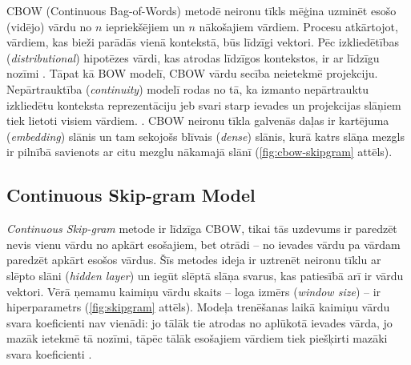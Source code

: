 CBOW (Continuous Bag-of-Words) metodē neironu tīkls mēģina uzminēt esošo (vidējo) vārdu no $n$ iepriekšējiem un $n$ nākošajiem vārdiem. Procesu atkārtojot, vārdiem, kas bieži parādās vienā kontekstā, būs līdzīgi vektori. Pēc izkliedētības (\textit{distributional}) hipotēzes vārdi, kas atrodas līdzīgos kontekstos, ir ar līdzīgu nozīmi \cite{word2vec2013}. Tāpat kā BOW modelī, CBOW vārdu secība neietekmē projekciju. Nepārtrauktība (\textit{continuity}) modelī rodas no tā, ka izmanto nepārtrauktu izkliedētu konteksta reprezentāciju
jeb svari starp ievades un projekcijas slāņiem tiek lietoti visiem vārdiem.
\cite{word2vec2013}.
CBOW neironu tīkla galvenās daļas ir kartējuma (\textit{embedding}) slānis un tam sekojošs blīvais (\textit{dense}) slānis, kurā katrs slāņa mezgls ir pilnībā savienots ar citu mezglu nākamajā slānī (\ref{fig:cbow-skipgram} attēls).



\subsection{Continuous Skip-gram Model}


\textit{Continuous Skip-gram} metode ir līdzīga CBOW, tikai tās uzdevums ir paredzēt nevis vienu vārdu no apkārt esošajiem, bet otrādi -- no ievades vārdu pa vārdam paredzēt apkārt esošos vārdus.
Šīs metodes ideja ir uztrenēt neironu tīklu ar slēpto slāni (\textit{hidden layer}) un iegūt slēptā slāņa svarus, kas patiesībā arī ir vārdu vektori. Vērā ņemamu kaimiņu vārdu skaits -- loga izmērs (\textit{window size}) -- ir hiperparametrs (\ref{fig:skipgram} attēls). Modeļa trenēšanas laikā kaimiņu vārdu svara koeficienti nav vienādi: jo tālāk tie atrodas no aplūkotā ievades vārda, jo mazāk ietekmē tā nozīmi, tāpēc tālāk esošajiem vārdiem tiek piešķirti mazāki svara koeficienti \cite{word2vec2013}. 


